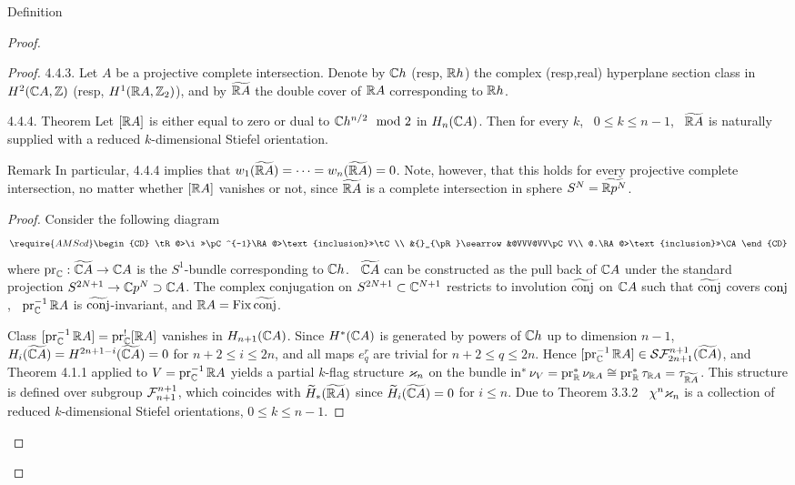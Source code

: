 \documentclass{article}
\begin{document}
\begin{subsubsection}{ Definition}
\begin{proof}
{\begin{proof}
{4.4.3. Let $A$ be a projective complete intersection. Denote by $\mathbb C h$ (resp,
$\mathbb R h$) the complex (resp,real) hyperplane section class in $H^2(\mathbb C A,\mathbb Z)$
(resp, $H^1(\mathbb R A,\mathbb Z_2)$), and by $\widetilde{\mathbb R A}$ the double cover of $\mathbb R A$ corresponding
to $\mathbb R h$.
\begin{proclaim}{ {4.4.4. Theorem} Let $[\mathbb R A]$ is either equal to zero or dual to
$\mathbb C h^{n/2}\mod2$ in $H_n(\mathbb C A)$. Then for every $k$, \ $0\le k\le n-1$, \ $\widetilde{\mathbb R A}$
is naturally supplied with a reduced $k$-dimensional Stiefel orientation.
}\end{proclaim}
\begin{remark}{ {Remark} In particular, 4.4.4 implies that $w_1(\widetilde{\mathbb R A})=\dots=w_n(\widetilde{\mathbb R A})=0$.
Note, however, that this holds for every projective complete intersection,
no matter whether $[\mathbb R A]$ vanishes or not, since $\widetilde{\mathbb R A}$ is a complete
intersection in sphere $S^N=\widetilde{\mathbb R p^N}$.
}\end{remark}
\begin{proof}{ Consider the following diagram
$$\require{AMScd}\begin{CD}
\tR@>\i>>\pC^{-1}\RA@>\text{inclusion}>>\tC\\
&{}_{\pR}\searrow&@VVV@VV\pC V\\
@.\RA@>\text{inclusion}>>\CA
\end{CD}
$$
where $\operatorname{pr}_\mathbb C:\widetilde{\mathbb C A}\to\mathbb C A$ is the $S^1$-bundle corresponding to $\mathbb C h$. \ $\widetilde{\mathbb C A}$ can
be constructed as the pull back of $\mathbb C A$ under the standard projection
$S^{2N+1}\to\mathbb C p^N\supset\mathbb C A$. The complex conjugation on
$S^{2N+1}\subset\mathbb C^{N+1}$ restricts to involution $\widetilde{\operatorname{conj}}$ on $\mathbb C A$ such that
$\widetilde{\operatorname{conj}}$ covers $\operatorname{conj}$, \ $\operatorname{pr}_\mathbb C^{-1}\mathbb R A$ is $\widetilde{\operatorname{conj}}$-invariant,
and $\mathbb R A=\operatorname{Fix}\widetilde{\operatorname{conj}}$.

Class $[\operatorname{pr}_\mathbb C^{-1}\mathbb R A]=\operatorname{pr}_\mathbb C^![\mathbb R A]$ vanishes in $H_{n+1}(\mathbb C A)$. Since $H^*(\mathbb C A)$
is generated by powers of $\mathbb C h$ up to dimension $n-1$, \
$H_i(\widetilde{\mathbb C A})=H^{2n+1-i}(\widetilde{\mathbb C A})=0$ for $n+2\le i\le 2n$, and all maps $e_q^r$ are
trivial for $n+2\le q\le 2n$. Hence $[\operatorname{pr}_\mathbb C^{-1}\mathbb R A]\in\mathcal S\mathcal F_{2n+1}^{n+1}(\widetilde{\mathbb C A})$,
and Theorem 4.1.1 applied to $V=\operatorname{pr}_\mathbb C^{-1}\mathbb R A$ yields a partial $k$-flag
structure $\varkappa_n$ on the bundle 
$\operatorname{in}^*\nu_V=\operatorname{pr}_\mathbb R^*\nu_{\mathbb R A}\cong\operatorname{pr}_\mathbb R^*\tau_{\mathbb R A}=\tau_{\widetilde{\mathbb R A}}$. This structure is
defined over subgroup $\mathcal F_{n+1}^{n+1}$, which coincides with
$\widetilde H_*(\widetilde{\mathbb R A})$ since $\widetilde H_i(\widetilde{\mathbb C A})=0$ for $i\le n$.
Due to Theorem 3.3.2 \ $\chi^n\varkappa_n$ is a collection of reduced $k$-dimensional
Stiefel orientations, $0\le k\le n-1$. 
}\end{proof}
%
\begin{thebibliography}{2}


\end{thebibliography}}
\end{proof}}
\end{proof}
\end{subsubsection}
\end{document}
